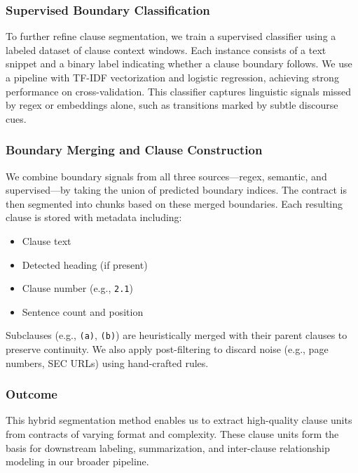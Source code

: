 \documentclass[11pt, oneside]{article}   	%
\begin{document}
\subsubsection*{Supervised Boundary Classification}

To further refine clause segmentation, we train a supervised classifier using a labeled dataset of clause context windows. Each instance consists of a text snippet and a binary label indicating whether a clause boundary follows. We use a pipeline with TF-IDF vectorization and logistic regression, achieving strong performance on cross-validation. This classifier captures linguistic signals missed by regex or embeddings alone, such as transitions marked by subtle discourse cues.

\subsubsection*{Boundary Merging and Clause Construction}

We combine boundary signals from all three sources—regex, semantic, and supervised—by taking the union of predicted boundary indices. The contract is then segmented into chunks based on these merged boundaries. Each resulting clause is stored with metadata including:
\begin{itemize}
    \item Clause text
    \item Detected heading (if present)
    \item Clause number (e.g., \texttt{2.1})
    \item Sentence count and position
\end{itemize}

Subclauses (e.g., \texttt{(a)}, \texttt{(b)}) are heuristically merged with their parent clauses to preserve continuity. We also apply post-filtering to discard noise (e.g., page numbers, SEC URLs) using hand-crafted rules.

\subsubsection*{Outcome}

This hybrid segmentation method enables us to extract high-quality clause units from contracts of varying format and complexity. These clause units form the basis for downstream labeling, summarization, and inter-clause relationship modeling in our broader pipeline.
\end{document}
